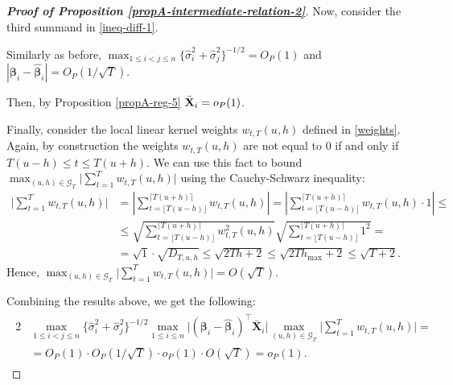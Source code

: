\documentclass[a4paper,12pt]{article}
\begin{document}
\begin{proof}[\textnormal{\textbf{Proof of Proposition \ref{propA-intermediate-relation-2}}}]
Now, consider the third summand in \eqref{ineq-diff-1}. 

Similarly as before, $\max_{1\le i < j \le n}\{\widehat{\sigma}_i^2+ \widehat{\sigma}_j^2 \}^{-1/2}  = O_P(1)$ and $|\bm{\beta}_i - \widehat{\bm{\beta}}_i| = O_P(1/\sqrt{T})$.

Then, by Proposition \ref{propA-reg-5} $\bar{\mathbf{X}}_i = o_P(1)$. 


Finally, consider the local linear kernel weights $w_{t,T}(u,h)$ defined in \eqref{weights}. Again, by construction the weights $w_{t, T}(u, h)$ are not equal to $0$ if and only if \linebreak $T(u-h) \le t \le T(u+h)$. We can use this fact to bound  $\max_{(u,h) \in \mathcal{G}_T}  \Big| \sum_{t=1}^T w_{t,T}(u,h)  \Big|$ using the Cauchy-Schwarz inequality:
\begin{align*}
\Big| \sum_{t=1}^T w_{t,T}(u,h)   \Big| & = \left| \sum_{t=\lfloor T(u-h) \rfloor}^{\lceil T(u+h) \rceil} w_{t,T}(u,h)   \right| = \left| \sum_{t=\lfloor T(u-h) \rfloor}^{\lceil T(u+h) \rceil} w_{t,T}(u,h)\cdot  1 \right| \leq\\
&\leq \sqrt{\sum_{t=\lfloor T(u-h) \rfloor}^{\lceil T(u+h) \rceil} w^2_{t,T}(u,h)}\sqrt{\sum_{t=\lfloor T(u-h) \rfloor}^{\lceil T(u+h) \rceil} 1^2} =\\
&=\sqrt{1}\cdot\sqrt{D_{T, u, h}}   \leq \sqrt{2Th + 2} \leq \sqrt{2Th_{\max} +2} \leq \sqrt{T+2}.
\end{align*}
Hence, $\max_{(u,h) \in \mathcal{G}_T}  \Big| \sum_{t=1}^T w_{t,T}(u,h)  \Big| = O(\sqrt{T})$.

Combining the results above, we get the following:
\begin{align}\label{ineq-diff-4}
\begin{split}
2&\max_{1\le i < j \le n} \{\widehat{\sigma}_i^2+ \widehat{\sigma}_j^2 \}^{-1/2}\max_{1\le i  \le n}\big|(\bm{\beta}_i - \widehat{\bm{\beta}}_i)^\top\bar{\mathbf{X}}_{i}\big| \max_{(u,h) \in \mathcal{G}_T}  \Big| \sum_{t=1}^T w_{t,T}(u,h)  \Big|  =  \\
&=O_P(1) \cdot O_P(1/\sqrt{T}) \cdot o_P(1) \cdot O(\sqrt{T}) = o_P(1).
\end{split}
\end{align}


\end{proof}
\end{document}
